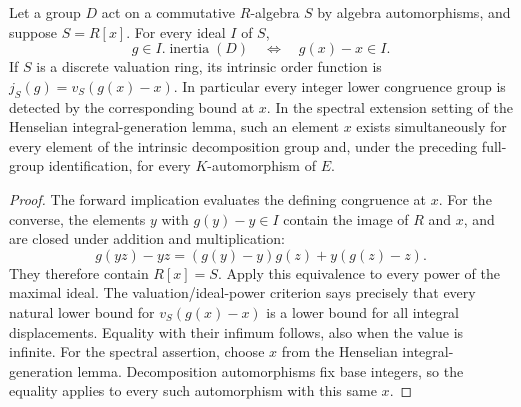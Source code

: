 \begin{lemma}
\label{fw:generator-evaluation}
\leanok
Let a group $D$ act on a commutative $R$-algebra $S$ by algebra
automorphisms, and suppose $S=R[x]$. For every ideal $I$ of $S$,
\[
 g\in I.\operatorname{inertia}(D)
 \quad\Longleftrightarrow\quad g(x)-x\in I.
\]
If $S$ is a discrete valuation ring, its intrinsic order function is
$j_S(g)=v_S(g(x)-x)$. In particular every integer lower congruence group
is detected by the corresponding bound at $x$.
In the spectral extension setting of the Henselian integral-generation
lemma, such an element $x$ exists simultaneously for every element of
the intrinsic decomposition group and, under the preceding full-group
identification, for every $K$-automorphism of $E$.
\end{lemma}
\begin{proof}
The forward implication evaluates the defining congruence at $x$.
For the converse, the elements $y$ with $g(y)-y\in I$ contain the
image of $R$ and $x$, and are closed under addition and multiplication:
\[
 g(yz)-yz=(g(y)-y)g(z)+y(g(z)-z).
\]
They therefore contain $R[x]=S$. Apply this equivalence to every power
of the maximal ideal. The valuation/ideal-power criterion says precisely
that every natural lower bound for $v_S(g(x)-x)$ is a lower bound for
all integral displacements. Equality with their infimum follows, also
when the value is infinite.
For the spectral assertion, choose $x$ from the Henselian
integral-generation lemma. Decomposition automorphisms fix base integers,
so the equality applies to every such automorphism with this same $x$.
\end{proof}

